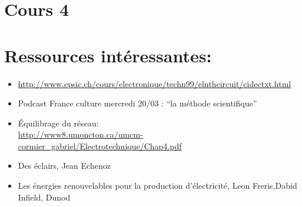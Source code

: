 \documentclass[main.tex]{subfiles}
\begin{document}
\section{Cours 4 }





\section{Ressources intéressantes:}
\begin{itemize}
\item \url{http://www.epsic.ch/cours/electronique/techn99/elnthcircuit/cidectxt.html}
\item Podcast France culture mercredi 20/03 : ``la méthode scientifique''
\item Équilibrage du réseau:\\
\url{http://www8.umoncton.ca/umcm-cormier_gabriel/Electrotechnique/Chap4.pdf}
\item Des éclairs, Jean Echenoz
\item Les énergies renouvelables pour la production d'électricité, Leon Freris,Dabid Infield, Dunod
\end{itemize}
\end{document}
